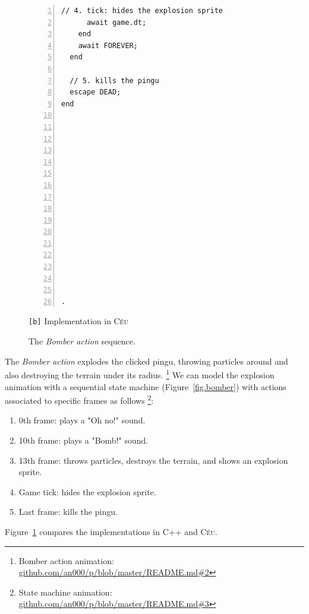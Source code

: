 \documentclass{vgtc}                          %
\newcommand{\CEU}{\textsc{C\'{e}u}\xspace}
\newcommand{\code}[1] {{\small{\texttt{#1}}}}
\newcommand{\bx}{\code{[b]}\xspace}
\begin{document}
\begin{figure}[th!]
\begin{minipage}[t]{0.50\linewidth}
\begin{lstlisting}[numbers=left,xleftmargin=3em]
      // 4. tick: hides the explosion sprite
      await game.dt;
    end
    await FOREVER;
  end

  // 5. kills the pingu
  escape DEAD;
end
















.
\end{lstlisting}
\centering\small{\bx Implementation in \CEU}
\end{minipage}
\caption{ The \emph{Bomber action} sequence.
\label{lst.bomber}
}
\end{figure}

The \emph{Bomber action} explodes the clicked pingu, throwing particles around
and also destroying the terrain under its radius.%
\footnote{Bomber action animation: \url{github.com/an000/p/blob/master/README.md#2} }
%
We can model the explosion animation with a sequential state machine
(Figure~\ref{fig.bomber}) with actions associated to specific frames as
follows%
\footnote{State machine animation: \url{github.com/an000/p/blob/master/README.md#3} }:
%
\begin{enumerate}
\item 0th frame:  plays a "Oh no!" sound.
\item 10th frame: plays a "Bomb!" sound.
\item 13th frame: throws particles, destroys the terrain, and shows an
                  explosion sprite.
\item Game tick:  hides the explosion sprite.
\item Last frame: kills the pingu.
\end{enumerate}

Figure~\ref{lst.bomber} compares the implementations in C++ and \CEU.
\end{document}

